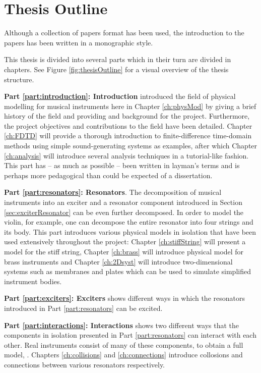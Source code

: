 \section{Thesis Outline}
Although a collection of papers format has been used, the introduction to the papers has been written in a monographic style. 

This thesis is divided into several parts which in their turn are divided in chapters. See Figure \ref{fig:thesisOutline} for a visual overview of the thesis structure.  

\textbf{Part \ref{part:introduction}: Introduction} introduced the field of physical modelling for musical instruments here in Chapter \ref{ch:physMod} by giving a brief history of the field and providing and background for the project. Furthermore, the project objectives and contributions to the field have been detailed. Chapter \ref{ch:FDTD} will provide a thorough introduction to finite-difference time-domain methods using simple sound-generating systems as examples, after which Chapter \ref{ch:analysis} will introduce several analysis techniques in a tutorial-like fashion. This part has -- as much as possible -- been written in layman's terms and is perhaps more pedagogical than could be expected of a dissertation.

\textbf{Part \ref{part:resonators}: Resonators}. The decomposition of musical instruments into an exciter and a resonator component introduced in Section \ref{sec:exciterResonator} can be even further decomposed. In order to model the violin, for example, one can decompose the entire resonator into four strings and its body. This part introduces various physical models in isolation that have been used extensively throughout the project: Chapter \ref{ch:stiffString} will present a model for the stiff string, Chapter \ref{ch:brass} will introduce physical model for brass instruments and Chapter \ref{ch:2Dsyst} will introduce two-dimensional systems such as membranes and plates which can be used to simulate simplified instrument bodies.

\textbf{Part \ref{part:exciters}: Exciters} shows different ways in which the resonators introduced in Part \ref{part:resonators} can be excited. 

\textbf{Part \ref{part:interactions}: Interactions} shows two different ways that the components in isolation presented in Part \ref{part:resonators} can interact with each other. Real instruments consist of many of these components, to obtain a full model, .  Chapters \ref{ch:collisions} and \ref{ch:connections} introduce collosions and connections between various resonators respectively. 



